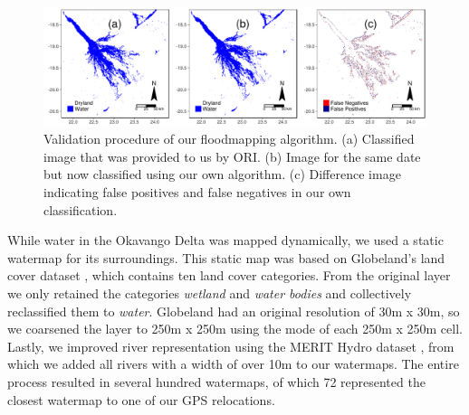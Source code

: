 \documentclass[abstract=on,10pt,a4paper,bibliography=totocnumbered]{scrartcl}
\begin{document}
\begin{figure}[ht]
  \begin{center}
    \includegraphics[width = \textwidth]{99_FloodmappingValidation.pdf}
    \caption{Validation procedure of our floodmapping algorithm. (a) Classified
    image that was provided to us by ORI. (b) Image for the same date but now
    classified using our own algorithm. (c) Difference image indicating false
    positives and false negatives in our own classification.}
    \label{FloodmappingValidation}
  \end{center}
\end{figure}

\noindent While water in the Okavango Delta was mapped dynamically, we used a
static watermap for its surroundings. This static map was based on Globeland's
land cover dataset \citep{Chen.2015}, which contains ten land cover categories.
From the original layer we only retained the categories \textit{wetland} and
\textit{water bodies} and collectively reclassified them to \textit{water}.
Globeland had an original resolution of 30m x 30m, so we coarsened the layer to
250m x 250m using the mode of each 250m x 250m cell. Lastly, we improved river
representation using the MERIT Hydro dataset \citep{Yamazaki.2019}, from which
we added all rivers with a width of over 10m to our watermaps. The entire
process resulted in several hundred watermaps, of which 72 represented the
closest watermap to one of our GPS relocations.
\end{document}
